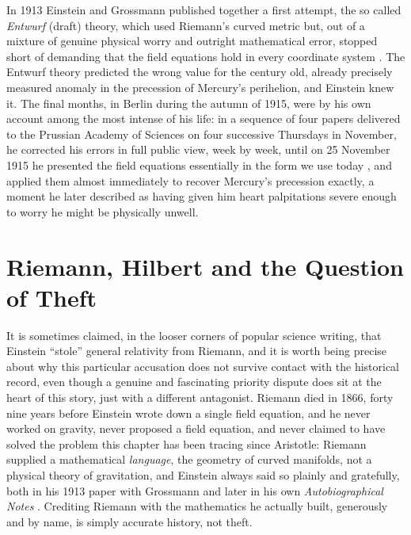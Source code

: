     In 1913 Einstein and Grossmann published together a first attempt, the so called \textit{Entwurf} (draft) theory, which used Riemann's curved metric but, out of a mixture of genuine physical worry and outright mathematical error, stopped short of demanding that the field equations hold in every coordinate system \citep{einsteingrossmann1913}. The Entwurf theory predicted the wrong value for the century old, already precisely measured anomaly in the precession of Mercury's perihelion, and Einstein knew it. The final months, in Berlin during the autumn of 1915, were by his own account among the most intense of his life: in a sequence of four papers delivered to the Prussian Academy of Sciences on four successive Thursdays in November, he corrected his errors in full public view, week by week, until on 25 November 1915 he presented the field equations essentially in the form we use today \citep{einstein1915}, and applied them almost immediately to recover Mercury's precession exactly, a moment he later described as having given him heart palpitations severe enough to worry he might be physically unwell.

\section{Riemann, Hilbert and the Question of Theft}

    It is sometimes claimed, in the looser corners of popular science writing, that Einstein ``stole'' general relativity from Riemann, and it is worth being precise about why this particular accusation does not survive contact with the historical record, even though a genuine and fascinating priority dispute does sit at the heart of this story, just with a different antagonist. Riemann died in 1866, forty nine years before Einstein wrote down a single field equation, and he never worked on gravity, never proposed a field equation, and never claimed to have solved the problem this chapter has been tracing since Aristotle: Riemann supplied a mathematical \textit{language}, the geometry of curved manifolds, not a physical theory of gravitation, and Einstein always said so plainly and gratefully, both in his 1913 paper with Grossmann and later in his own \textit{Autobiographical Notes} \citep{einstein1949}. Crediting Riemann with the mathematics he actually built, generously and by name, is simply accurate history, not theft.

